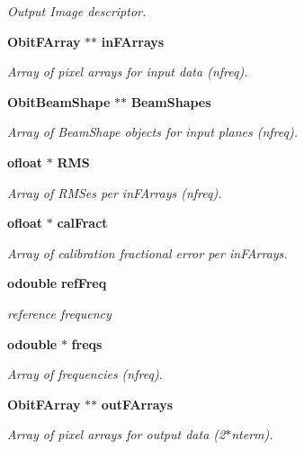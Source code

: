 \begin{CompactItemize}
\begin{CompactList}\small\item\em Output Image descriptor. \item\end{CompactList}\item 
{\bf Obit\-FArray} $\ast$$\ast$ {\bf in\-FArrays}
\begin{CompactList}\small\item\em Array of pixel arrays for input data (nfreq). \item\end{CompactList}\item 
{\bf Obit\-Beam\-Shape} $\ast$$\ast$ {\bf Beam\-Shapes}
\begin{CompactList}\small\item\em Array of Beam\-Shape objects for input planes (nfreq). \item\end{CompactList}\item 
{\bf ofloat} $\ast$ {\bf RMS}
\begin{CompactList}\small\item\em Array of RMSes per in\-FArrays (nfreq). \item\end{CompactList}\item 
{\bf ofloat} $\ast$ {\bf cal\-Fract}
\begin{CompactList}\small\item\em Array of calibration fractional error per in\-FArrays. \item\end{CompactList}\item 
{\bf odouble} {\bf ref\-Freq}
\begin{CompactList}\small\item\em reference frequency \item\end{CompactList}\item 
{\bf odouble} $\ast$ {\bf freqs}
\begin{CompactList}\small\item\em Array of frequencies (nfreq). \item\end{CompactList}\item 
{\bf Obit\-FArray} $\ast$$\ast$ {\bf out\-FArrays}
\begin{CompactList}\small\item\em Array of pixel arrays for output data (2$\ast$nterm). \item\end{CompactList}\end{CompactItemize}


